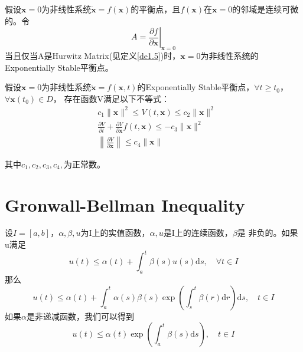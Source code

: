 \documentclass[lang=cn,10pt]{elegantbook}
\newcommand\bv[1]{\boldsymbol{#1}}
\begin{document}
\begin{theorem}\label{th3.2}
	假设$\bv{x} = 0$为非线性系统$\dot{\bv{x}}=f(\bv{x})$的平衡点，且$f(\bv{x})$在$\bv{x} = 0$的邻域是连续可微的。令
	\begin{equation}
		A=\left.\frac{\partial f}{\partial \bv{x}}\right|_{\bv{x}=0}
	\end{equation}
	当且仅当A是Hurwitz Matrix(见定义\ref{de1.5})时，$\bv{x}=0$为非线性系统的Exponentially Stable平衡点。
\end{theorem}

\begin{theorem}\label{th3.3}
	假设$\bv{x} = 0$为非线性系统$\dot{\bv{x}}=f(\bv{x},t)$的Exponentially Stable平衡点，$\forall t \geq t_0$，$\forall \bv{x}(t_0) \in D$，
	存在函数V满足以下不等式：
	\begin{equation}
		\begin{aligned}
			 & c_{1}\|\bv{x}\|^{2}\leq V(t,\bv{x})\leq c_{2}\|\bv{x}\|^{2}                                         \\
			 & \frac{\partial V}{\partial t}+\frac{\partial V}{\partial \bv{x}}f(t,\bv{x})\leq-c_{3}\|\bv{x}\|^{2} \\
			 & \left\|{\frac{\partial V}{\partial \bv{x}}}\right\|\leq c_{4}\|\bv{x}\|
		\end{aligned}
	\end{equation}
	\par 其中$c_1,c_2,c_3,c_4,$为正常数。
\end{theorem}

\section{Gronwall-Bellman Inequality}
\begin{theorem}
	设$I=[a,b]$，$\alpha,\beta,u$为I上的实值函数，$\alpha,u$是I上的连续函数，$\beta$是
	非负的。如果u满足
	\begin{equation}\label{eq3.4}
		u(t)\leq\alpha(t)+\int_a^t\beta(s)u(s)\mathrm{d}s,\quad\forall t\in I
	\end{equation}
	那么
	\begin{equation}\label{eq3.5}
		u(t)\leq\alpha(t)+\int_a^t\alpha(s)\beta(s)\exp\left(\int_s^t\beta(r)\mathrm{d}r\right)\mathrm{d}s,\quad t\in I
	\end{equation}
	如果$\alpha$是非递减函数，我们可以得到
	\begin{equation}\label{eq3.6}
		u(t)\leq\alpha(t)\exp\left(\int_{a}^{t}\beta(s)\mathrm{d}s\right),\quad t\in I
	\end{equation}
\end{theorem}
\end{document}
